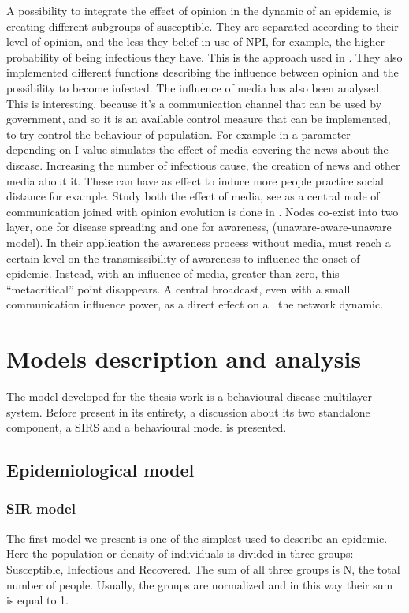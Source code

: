 A possibility to integrate the effect of opinion in the dynamic of an epidemic, is creating different subgroups of susceptible. They are separated according to their level of opinion, and the less they belief in use of NPI, for example, the higher probability of being infectious they have. This is the approach used in \cite{Tyson_2020}. They also implemented different functions describing the influence between opinion and the possibility to become infected. 
The influence of media has also been analysed. This is interesting, because it’s a communication channel that can be used by government, and so it is an available control measure that can be implemented, to try control the behaviour of population.  For example in \cite{Collinson2014} a parameter depending on I value simulates the effect of media covering the news about the disease. Increasing the number of infectious cause, the creation of news and other media about it. These can have as effect to induce more people practice social distance for example. Study both the effect of media, see as a central node of communication joined with opinion evolution is done in \cite{Granell_2014}. Nodes co-exist into two layer, one for disease spreading and one for awareness, (unaware-aware-unaware model). In their application the awareness process without media, must reach a certain level on the transmissibility of awareness to influence the onset of epidemic. Instead, with an influence of media, greater than zero, this “metacritical” point disappears. A central broadcast, even with a small communication influence power, as a direct effect on all the network dynamic. 




\chapter{Models description and analysis}
The model developed for the thesis work is a behavioural disease multilayer system. Before present in its entirety, a discussion about its two standalone component, a SIRS and a behavioural model is presented.

\section{Epidemiological model}

\subsection{SIR model}
\label{subsec:SIR}
The first model we present is one of the simplest used to describe an epidemic. Here the population or density of individuals is divided in three groups: Susceptible, Infectious and Recovered. 
The sum of all three groups is N, the total number of people. Usually, the groups are normalized and in this way their sum is equal to 1. 

